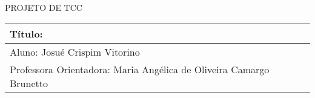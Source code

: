 

\begin{center}
PROJETO DE TCC 


\begin{tabular}{l|l}
\hline
T\'itulo:  \\ 
\hline
Aluno: Josué Crispim Vitorino \\ 
\hline
Professora Orientadora:  Maria Ang\'elica de Oliveira Camargo Brunetto \\ 
\hline
\end{tabular}\\


\end{center}
